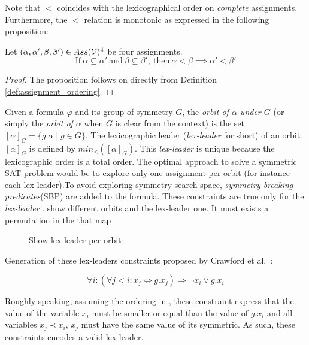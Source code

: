 Note that $<$ coincides with the lexicographical order on \emph{complete}
assignments. Furthermore, the $<$ relation is monotonic as expressed in the following proposition:

\begin{proposition}
	\label{prop:monocity_assignments_ordering}
	Let  $(\alpha,\alpha',\beta,\beta') \in Ass(\mathcal{V})^4 $ be four assignments.
	$$\text{If}~\alpha \subseteq \alpha'~\text{and}~\beta \subseteq \beta',~\text{then}~\alpha < \beta \implies \alpha' < \beta'$$
\end{proposition}

\begin{proof}
	The proposition follows on directly from Definition \ref{def:assignment_ordering}.
\end{proof}


Given a formula $\varphi$ and its group of symmetry $G$,
the \emph{orbit of $\alpha$ under $G$} (or
simply the \emph{orbit of $\alpha$} when $G$ is clear from the context) is the set
$ [\alpha]_G=\{ g.\alpha \mid g \in G \}$. 
The lexicographic leader (\textit{lex-leader} for short) of an orbit $[\alpha]_G$ is defined by
$min_<([\alpha]_G)$. This \textit{lex-leader} is unique because the lexicographic
order is a total order.
The optimal approach to solve a symmetric SAT problem would be to explore
only one assignment per orbit (for instance each lex-leader).To avoid exploring 
symmetry search space, \emph{symmetry breaking predicates}(SBP) are added to the formula.
These constraints are true only for the \emph{lex-leader} \cite{crawford1996symmetry}.
 show different orbits and the lex-leader one. It must exists a permutation in 
the that map 

\begin{figure}[!htbp]
	\centering
	
	\caption{Show lex-leader per orbit}
	\label{fig:lex-leader}
\end{figure}




Generation of these lex-leaders constraints proposed by Crawford et al.~\cite{crawford1996symmetry}:

$$\forall i : (\forall j < i : x_j \Leftrightarrow g.x_j) \Rightarrow \neg x_i \vee g.x_i$$

Roughly speaking, assuming the ordering in , these constraint express that 
the value of the variable $x_i$ must be smaller or equal than the value of $g.x_i$ and all variables
$x_j \prec x_i$, $x_j$ must have the same value of its symmetric. As such, these constraints encodes a valid lex leader.





